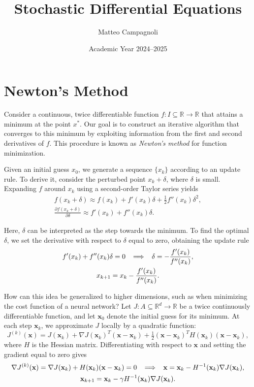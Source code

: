 \documentclass{article}
\title{Stochastic Differential Equations}
\author{Matteo Campagnoli}
\date{Academic Year 2024--2025}
\numberwithin{equation}{subsection}
\begin{document}
\maketitle
\tableofcontents

\newpage

\section{Newton’s Method}
Consider a continuous, twice differentiable function $f : I \subseteq \mathbb{R} \to \mathbb{R}$ that attains a minimum at the point $x^*$. Our goal is to construct an iterative algorithm that converges to this minimum by exploiting information from the first and second derivatives of $f$. This procedure is known as \emph{Newton’s method} for function minimization.  

Given an initial guess $x_0$, we generate a sequence $\{x_k\}$ according to an update rule. To derive it, consider the perturbed point $x_k + \delta$, where $\delta$ is small. Expanding $f$ around $x_k$ using a second-order Taylor series yields
\begin{gather*}
    f(x_k + \delta) \approx f(x_k) + f'(x_k)\delta + \tfrac{1}{2} f''(x_k)\delta^2, \\
    \frac{\partial f(x_k+\delta)}{\partial \delta} \approx f'(x_k) + f''(x_k)\delta.
\end{gather*}

Here, $\delta$ can be interpreted as the step towards the minimum. To find the optimal $\delta$, we set the derivative with respect to $\delta$ equal to zero, obtaining the update rule
\begin{gather}
    f'(x_k) + f''(x_k)\delta = 0 
    \;\;\implies\;\; 
    \delta = -\frac{f'(x_k)}{f''(x_k)}, \notag \\
    x_{k+1} = x_k - \frac{f'(x_k)}{f''(x_k)}.
\end{gather}

How can this idea be generalized to higher dimensions, such as when minimizing the cost function of a neural network? Let $J : A \subseteq \mathbb{R}^d \to \mathbb{R}$ be a twice continuously differentiable function, and let $\mathbf{x}_0$ denote the initial guess for its minimum. At each step $\mathbf{x}_k$, we approximate $J$ locally by a quadratic function:
\begin{equation*}
    J^{(k)}(\mathbf{x}) = J(\mathbf{x}_k) 
    + \nabla J(\mathbf{x}_k)^T (\mathbf{x} - \mathbf{x}_k) 
    + \tfrac{1}{2} (\mathbf{x} - \mathbf{x}_k)^T H(\mathbf{x}_k)(\mathbf{x} - \mathbf{x}_k),
\end{equation*}
where $H$ is the Hessian matrix. Differentiating with respect to $\mathbf{x}$ and setting the gradient equal to zero gives
\begin{gather}
    \nabla J^{(k)}(\mathbf{x}) 
    = \nabla J(\mathbf{x}_k) + H(\mathbf{x}_k)(\mathbf{x} - \mathbf{x}_k) = 0 \notag \;\; \implies\;\; \mathbf{x} = \mathbf{x}_k - H^{-1}(\mathbf{x}_k)\nabla J(\mathbf{x}_k), \\
    \mathbf{x}_{k+1} = \mathbf{x}_k - \gamma H^{-1}(\mathbf{x}_k)\nabla J(\mathbf{x}_k). \notag
\end{gather}
\end{document}
